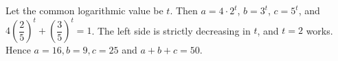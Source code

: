 Let the common logarithmic value be $t$. Then $a=4\cdot2^t$, $b=3^t$, $c=5^t$, and $4(\dfrac{2}{5})^t+(\dfrac{3}{5})^t=1$. The left side is strictly decreasing in $t$, and $t=2$ works. Hence $a=16,b=9,c=25$ and $\boxed{a+b+c=50}$.

